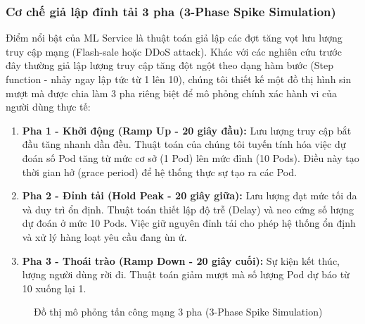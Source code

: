 \subsubsection{Cơ chế giả lập đỉnh tải 3 pha (3-Phase Spike Simulation)}
Điểm nổi bật của ML Service là thuật toán giả lập các đợt tăng vọt lưu lượng truy cập mạng (Flash-sale hoặc DDoS attack). Khác với các nghiên cứu trước đây thường giả lập lượng truy cập tăng đột ngột theo dạng hàm bước (Step function - nhảy ngay lập tức từ 1 lên 10), chúng tôi thiết kế một đồ thị hình sin mượt mà được chia làm 3 pha riêng biệt để mô phỏng chính xác hành vi của người dùng thực tế:

\begin{enumerate}
    \item \textbf{Pha 1 - Khởi động (Ramp Up - 20 giây đầu):} Lưu lượng truy cập bắt đầu tăng nhanh dần đều. Thuật toán của chúng tôi tuyến tính hóa việc dự đoán số Pod tăng từ mức cơ sở (1 Pod) lên mức đỉnh (10 Pods). Điều này tạo thời gian hở (grace period) để hệ thống thực sự tạo ra các Pod.
    \item \textbf{Pha 2 - Đỉnh tải (Hold Peak - 20 giây giữa):} Lưu lượng đạt mức tối đa và duy trì ổn định. Thuật toán thiết lập độ trễ (Delay) và neo cứng số lượng dự đoán ở mức 10 Pods. Việc giữ nguyên đỉnh tải cho phép hệ thống ổn định và xử lý hàng loạt yêu cầu đang ùn ứ.
    \item \textbf{Pha 3 - Thoái trào (Ramp Down - 20 giây cuối):} Sự kiện kết thúc, lượng người dùng rời đi. Thuật toán giảm mượt mà số lượng Pod dự báo từ 10 xuống lại 1.
\end{enumerate}

\begin{figure}[h!]
    \centering
    \caption{Đồ thị mô phỏng tấn công mạng 3 pha (3-Phase Spike Simulation)}
    \label{fig:3phase}
\end{figure}

